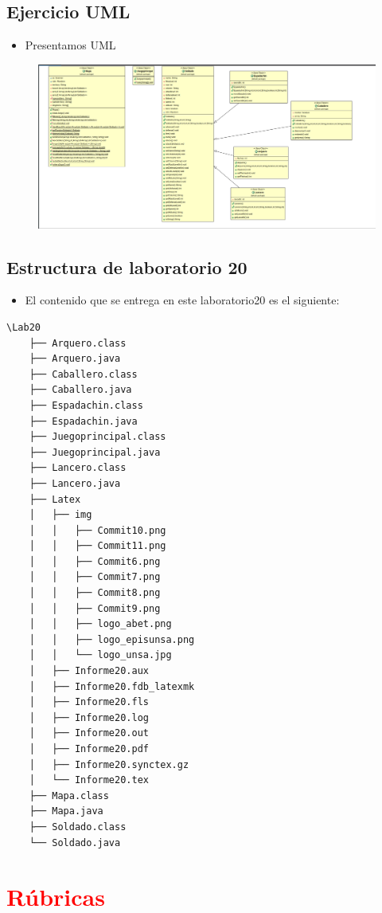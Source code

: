 \documentclass{article}
\begin{document}
	\subsection{Ejercicio UML}
	\begin{itemize}	
		\item Presentamos UML
	\end{itemize}
	\begin{figure}[H]
		\centering
		\includegraphics[width=1.0\textwidth,keepaspectratio]{img/UML.png}
	\end{figure}
	\subsection{Estructura de laboratorio 20}
	\begin{itemize}	
		\item El contenido que se entrega en este laboratorio20 es el siguiente:
	\end{itemize}
	\begin{lstlisting}[style=ascii-tree]
	\Lab20
	├── Arquero.class
	├── Arquero.java
	├── Caballero.class
	├── Caballero.java
	├── Espadachin.class
	├── Espadachin.java
	├── Juegoprincipal.class
	├── Juegoprincipal.java
	├── Lancero.class
	├── Lancero.java
	├── Latex
	│   ├── img
	│   │   ├── Commit10.png
	│   │   ├── Commit11.png
	│   │   ├── Commit6.png
	│   │   ├── Commit7.png
	│   │   ├── Commit8.png
	│   │   ├── Commit9.png
	│   │   ├── logo_abet.png
	│   │   ├── logo_episunsa.png
	│   │   └── logo_unsa.jpg
	│   ├── Informe20.aux
	│   ├── Informe20.fdb_latexmk
	│   ├── Informe20.fls
	│   ├── Informe20.log
	│   ├── Informe20.out
	│   ├── Informe20.pdf
	│   ├── Informe20.synctex.gz
	│   └── Informe20.tex
	├── Mapa.class
	├── Mapa.java
	├── Soldado.class
	└── Soldado.java
	\end{lstlisting}    
	\section{\textcolor{red}{Rúbricas}}
	
\end{document}
